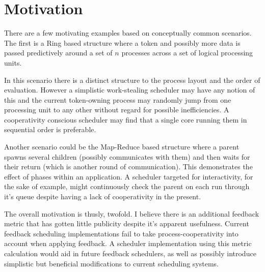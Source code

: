 
\section{Motivation}
There are a few motivating examples based on conceptually common scenarios. The first is a Ring based structure 
where a token and possibly more data is passed predictively around a set of $n$ processes across a set of logical
processing units.

In this scenario there is a distinct structure to the process layout and the order of evaluation. However a 
simplistic work-stealing scheduler may have any notion of this and the current token-owning process may randomly
jump from one processing unit to any other without regard for possible inefficiencies. A cooperativity conscious
scheduler may find that a single core running them in sequential order is preferable.

Another scenario could be the Map-Reduce based structure where a parent spawns several children (possibly 
communicates with them) and then waits for their return (which is another round of communication). This 
demonstrates the effect of phases within an application. A scheduler targeted for interactivity, for the sake
of example, might continuously check the parent on each run through it's queue despite having a lack of 
cooperativity in the present.

The overall motivation is thusly, twofold. I believe there is an additional feedback metric that has gotten little
publicity despite it's apparent usefulness. Current feedback scheduling implementations fail to take 
process-cooperativity into account when applying feedback. A scheduler implementation using this metric calculation 
would aid in future feedback schedulers, as well as possibly introduce simplistic but beneficial modifications to 
current scheduling systems.


